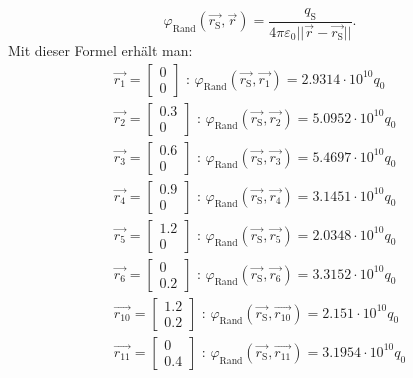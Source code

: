 \documentclass[Protokollheft.tex]{subfiles}
\begin{document}
$$\varphi_\text{Rand}(\vec{r_\text{S}},\vec{r})=\frac{q_\text{S}}{4\pi\varepsilon_0\vert\vert \vec{r}-\vec{r_\text{S}}\vert\vert}. $$
Mit dieser Formel erhält man:
\begin{eqnarray}
\vec{r_1}=\begin{bmatrix}
0 \\
0    
\end{bmatrix} \text{ :       }\varphi_\text{Rand}(\vec{r_\text{S}},\vec{r_1})= 2.9314 \cdot 10^{10}q_0\\
\vec{r_2}=\begin{bmatrix}
0.3 \\
0    
\end{bmatrix} \text{ :       }\varphi_\text{Rand}(\vec{r_\text{S}},\vec{r_2})= 5.0952 \cdot 10^{10}q_0\\
\vec{r_3}=\begin{bmatrix}
0.6 \\
0    
\end{bmatrix} \text{ :       }\varphi_\text{Rand}(\vec{r_\text{S}},\vec{r_3})= 5.4697 \cdot 10^{10}q_0\\
\vec{r_4}=\begin{bmatrix}
0.9 \\
0    
\end{bmatrix} \text{ :       }\varphi_\text{Rand}(\vec{r_\text{S}},\vec{r_4})= 3.1451 \cdot 10^{10}q_0\\
\vec{r_5}=\begin{bmatrix}
1.2 \\
0    
\end{bmatrix} \text{ :       }\varphi_\text{Rand}(\vec{r_\text{S}},\vec{r_5})= 2.0348 \cdot 10^{10}q_0\\
\vec{r_6}=\begin{bmatrix}
0 \\
0.2    
\end{bmatrix} \text{ :       }\varphi_\text{Rand}(\vec{r_\text{S}},\vec{r_6})= 3.3152 \cdot 10^{10}q_0\\
\vec{r_{10}}=\begin{bmatrix}
1.2 \\
0.2    
\end{bmatrix} \text{ :       }\varphi_\text{Rand}(\vec{r_\text{S}},\vec{r_{10}})= 2.151 \cdot 10^{10}q_0\\
\vec{r_{11}}=\begin{bmatrix}
0 \\
0.4    
\end{bmatrix} \text{ :       }\varphi_\text{Rand}(\vec{r_\text{S}},\vec{r_{11}})= 3.1954 \cdot 10^{10}q_0\\

\end{eqnarray}
\end{document}
